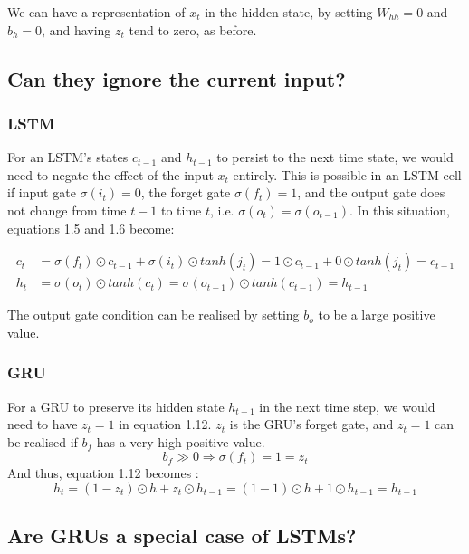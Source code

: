 \documentclass[paper=a4, fontsize=11pt]{scrartcl} %
\numberwithin{equation}{section} %
\numberwithin{figure}{section} %
\numberwithin{table}{section} %
\begin{document}
We can have a representation of $x_t$ in the hidden state, by setting $W_{hh} = 0$ and $b_h = 0$, and having $z_t$ tend to zero, as before.\\

\newpage

\subsection{Can they ignore the current input?}

\subsubsection{LSTM}

For an LSTM's states $c_{t-1}$ and $h_{t-1}$ to persist to the next time state, we would need to negate the effect of the input $x_t$ entirely. This is possible in an LSTM cell if input gate $\sigma (i_t) = 0$, the forget gate  $\sigma (f_t) = 1$, and the output gate does not change from time $t-1$ to time $t$, i.e. $\sigma (o_t) = \sigma (o_{t-1})$. In this situation, equations 1.5 and 1.6 become:

\begin{align}
c_t & = \sigma (f_t) \odot c_{t-1} + \sigma (i_t) \odot	 tanh(j_t) = 1 \odot c_{t-1} + 0 \odot tanh(j_t) = c_{t-1}\\
h_t & = \sigma (o_t) \odot tanh(c_t) = \sigma (o_{t-1}) \odot tanh(c_{t-1}) = h_{t-1}
\end{align}

The output gate condition can be realised by setting $b_o$ to be a large positive value.


\subsubsection{GRU}

For a GRU to preserve its hidden state $h_{t-1}$ in the next time step, we would need to have $z_t = 1$ in equation 1.12. $z_t$ is the GRU's forget gate, and $z_t = 1$ can be realised if $b_f$ has a very high positive value. $$b_f \gg 0 \Rightarrow \sigma (f_t) = 1 = z_t$$  And thus, equation 1.12 becomes :
\[
h_t = (1-z_t) \odot h + z_t \odot h_{t-1} = (1-1) \odot h + 1 \odot h_{t-1} = h_{t-1}
\]

\subsection{Are GRUs a special case of LSTMs?}
\end{document}
